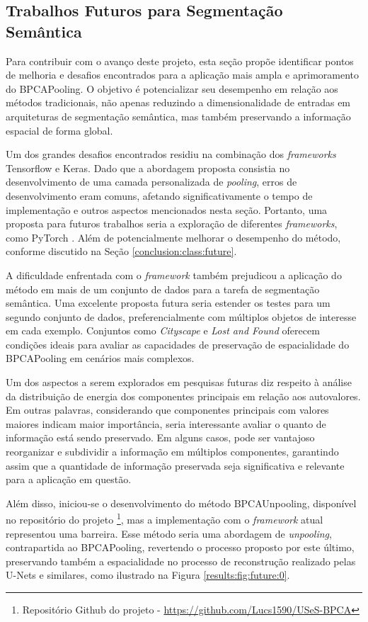 \subsection{Trabalhos Futuros para Segmentação Semântica}
\label{conclusion:semantic:future}
Para contribuir com o avanço deste projeto, esta seção propõe identificar pontos de melhoria e desafios encontrados para a aplicação mais ampla e aprimoramento do BPCAPooling. O objetivo é potencializar seu desempenho em relação aos métodos tradicionais, não apenas reduzindo a dimensionalidade de entradas em arquiteturas de segmentação semântica, mas também preservando a informação espacial de forma global.

Um dos grandes desafios encontrados residiu na combinação dos \textit{frameworks} Tensorflow e Keras. Dado que a abordagem proposta consistia no desenvolvimento de uma camada personalizada de \textit{pooling}, erros de desenvolvimento eram comuns, afetando significativamente o tempo de implementação e outros aspectos mencionados nesta seção. Portanto, uma proposta para futuros trabalhos seria a exploração de diferentes \textit{frameworks}, como PyTorch \citep{Paszke2017AutomaticPyTorch}. Além de potencialmente melhorar o desempenho do método, conforme discutido na Seção \ref{conclusion:class:future}.

A dificuldade enfrentada com o \textit{framework} também prejudicou a aplicação do método em mais de um conjunto de dados para a tarefa de segmentação semântica. Uma excelente proposta futura seria estender os testes para um segundo conjunto de dados, preferencialmente com múltiplos objetos de interesse em cada exemplo. Conjuntos como \textit{Cityscape} \citep{Cordts2016} e \textit{Lost and Found} \citep{Pinggera2016LostVehicles} oferecem condições ideais para avaliar as capacidades de preservação de espacialidade do BPCAPooling em cenários mais complexos.

Um dos aspectos a serem explorados em pesquisas futuras diz respeito à análise da distribuição de energia dos componentes principais em relação aos autovalores. Em outras palavras, considerando que componentes principais com valores maiores indicam maior importância, seria interessante avaliar o quanto de informação está sendo preservado. Em alguns casos, pode ser vantajoso reorganizar e subdividir a informação em múltiplos componentes, garantindo assim que a quantidade de informação preservada seja significativa e relevante para a aplicação em questão.

Além disso, iniciou-se o desenvolvimento do método BPCAUnpooling, disponível no repositório do projeto \footnote{Repositório Github do projeto - \url{https://github.com/Lucs1590/USeS-BPCA}}, mas a implementação com o \textit{framework} atual representou uma barreira. Esse método seria uma abordagem de \textit{unpooling}, contrapartida ao BPCAPooling, revertendo o processo proposto por este último, preservando também a espacialidade no processo de reconstrução realizado pelas U-Nets e similares, como ilustrado na Figura \ref{results:fig:future:0}.

